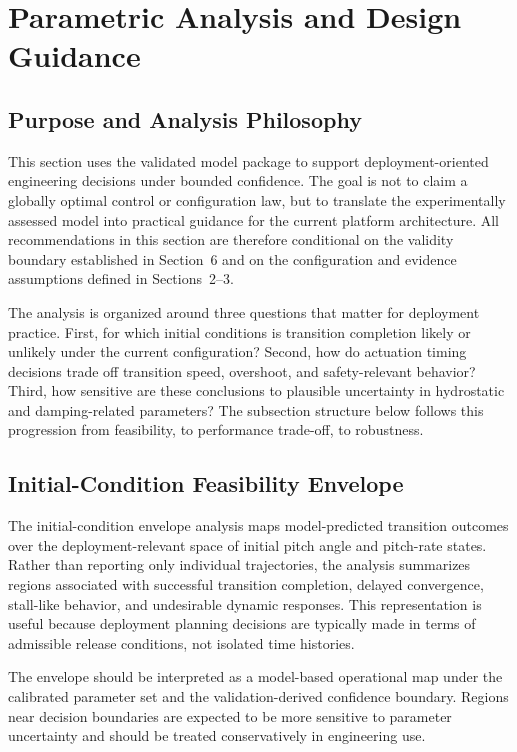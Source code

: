 \section{Parametric Analysis and Design Guidance}

\subsection{Purpose and Analysis Philosophy}

This section uses the validated model package to support deployment-oriented engineering decisions under bounded confidence. The goal is not to claim a globally optimal control or configuration law, but to translate the experimentally assessed model into practical guidance for the current platform architecture. All recommendations in this section are therefore conditional on the validity boundary established in Section~6 and on the configuration and evidence assumptions defined in Sections~2--3.

The analysis is organized around three questions that matter for deployment practice. First, for which initial conditions is transition completion likely or unlikely under the current configuration? Second, how do actuation timing decisions trade off transition speed, overshoot, and safety-relevant behavior? Third, how sensitive are these conclusions to plausible uncertainty in hydrostatic and damping-related parameters? The subsection structure below follows this progression from feasibility, to performance trade-off, to robustness.

\subsection{Initial-Condition Feasibility Envelope}

The initial-condition envelope analysis maps model-predicted transition outcomes over the deployment-relevant space of initial pitch angle and pitch-rate states. Rather than reporting only individual trajectories, the analysis summarizes regions associated with successful transition completion, delayed convergence, stall-like behavior, and undesirable dynamic responses. This representation is useful because deployment planning decisions are typically made in terms of admissible release conditions, not isolated time histories.

The envelope should be interpreted as a model-based operational map under the calibrated parameter set and the validation-derived confidence boundary. Regions near decision boundaries are expected to be more sensitive to parameter uncertainty and should be treated conservatively in engineering use.

